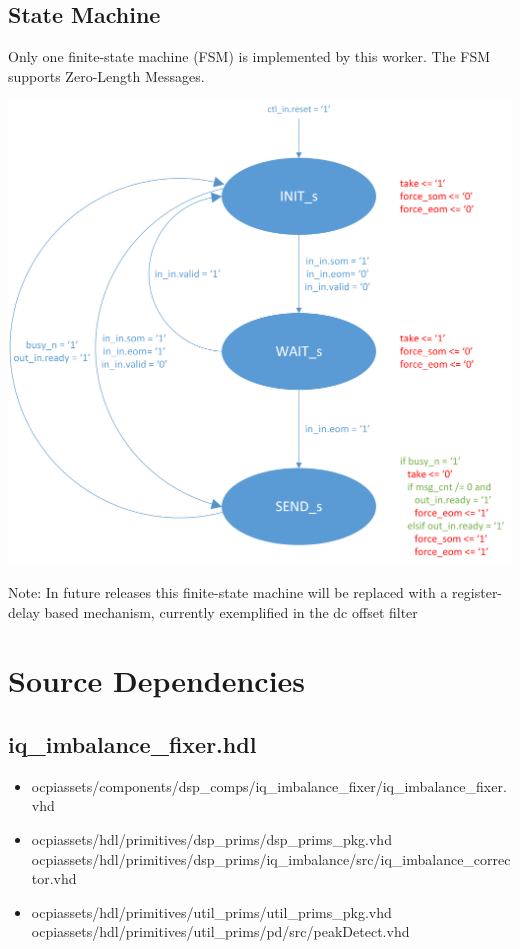 \documentclass{article}
\def\comp{iq\_imbalance\_fixer}
\begin{document}
	\subsection*{State Machine}
	\begin{flushleft}
		Only one finite-state machine (FSM) is implemented by this worker. The FSM supports Zero-Length Messages.
	\end{flushleft}
	{\centering\captionsetup{type=figure}\includegraphics[scale=0.6]{zlm_fsm}\par{}\label{fig:zlm_fsm}}
        \begin{flushleft}
                Note: In future releases this finite-state machine will be replaced with a register-delay based mechanism, currently exemplified in the dc offset filter
        \end{flushleft}

	\newpage

	\section*{Source Dependencies}
	\subsection*{\comp.hdl}
	\begin{itemize}
		\item ocpiassets/components/dsp\_comps/iq\_imbalance\_fixer/iq\_imbalance\_fixer.vhd
		\item ocpiassets/hdl/primitives/dsp\_prims/dsp\_prims\_pkg.vhd
		      \subitem ocpiassets/hdl/primitives/dsp\_prims/iq\_imbalance/src/iq\_imbalance\_corrector.vhd
		\item ocpiassets/hdl/primitives/util\_prims/util\_prims\_pkg.vhd
		      \subitem ocpiassets/hdl/primitives/util\_prims/pd/src/peakDetect.vhd
	\end{itemize}
\end{document}
